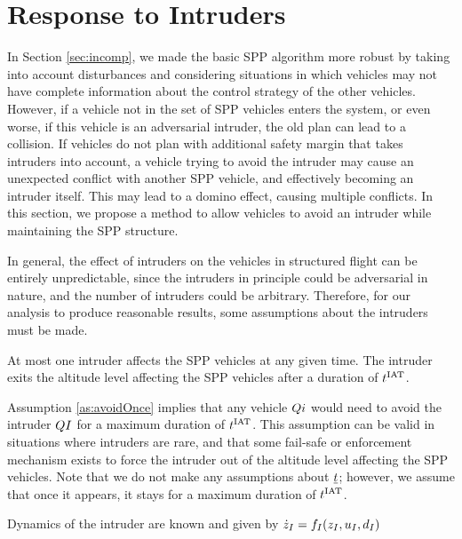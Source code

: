 \section{Response to Intruders \label{sec:HJIVI}}
In Section \ref{sec:incomp}, we made the basic SPP algorithm more robust by taking into account disturbances and considering situations in which vehicles may not have complete information about the control strategy of the other vehicles. However, if a vehicle not in the set of SPP vehicles enters the system, or even worse, if this vehicle is an adversarial intruder, the old plan can lead to a collision. If vehicles do not plan with additional safety margin that takes intruders into account, a vehicle trying to avoid the intruder may cause an unexpected conflict with another SPP vehicle, and effectively becoming an intruder itself. This may lead to a domino effect, causing multiple conflicts. In this section, we propose a method to allow vehicles to avoid an intruder while maintaining the SPP structure.

In general, the effect of intruders on the vehicles in structured flight can be entirely unpredictable, since the intruders in principle could be adversarial in nature, and the number of intruders could be arbitrary. Therefore, for our analysis to produce reasonable results, some assumptions about the intruders must be made.

\begin{assumption}
\label{as:avoidOnce}
At most one intruder affects the SPP vehicles at any given time. The intruder exits the altitude level affecting the SPP vehicles after a duration of $t^\text{IAT}$.
\end{assumption}

Assumption \ref{as:avoidOnce} implies that any vehicle $Q{i}$ would need to avoid the intruder $Q{I}$ for a maximum duration of $t^\text{IAT}$. This assumption can be valid in situations where intruders are rare, and that some fail-safe or enforcement mechanism exists to force the intruder out of the altitude level affecting the SPP vehicles. Note that we do not make any assumptions about $\underline{t}$; however, we assume that once it appears, it stays for a maximum duration of $t^\text{IAT}$.

\begin{assumption}
\label{as:dynKnown}
Dynamics of the intruder are known and given by $\dot{z}_I = f_I(z_I, u_I, d_I)$
\end{assumption}

